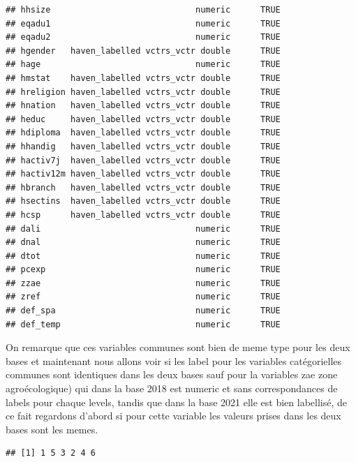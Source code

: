 \documentclass[
]{article}
\newenvironment{Shaded}{\begin{snugshade}}{\end{snugshade}}
\newcommand{\DocumentationTok}[1]{\textcolor[rgb]{0.56,0.35,0.01}{\textbf{\textit{#1}}}}
\newcommand{\FunctionTok}[1]{\textcolor[rgb]{0.13,0.29,0.53}{\textbf{#1}}}
\newcommand{\NormalTok}[1]{#1}
\newcommand{\SpecialCharTok}[1]{\textcolor[rgb]{0.81,0.36,0.00}{\textbf{#1}}}
\begin{document}
\begin{verbatim}
## hhsize                             numeric      TRUE
## eqadu1                             numeric      TRUE
## eqadu2                             numeric      TRUE
## hgender   haven_labelled vctrs_vctr double      TRUE
## hage                               numeric      TRUE
## hmstat    haven_labelled vctrs_vctr double      TRUE
## hreligion haven_labelled vctrs_vctr double      TRUE
## hnation   haven_labelled vctrs_vctr double      TRUE
## heduc     haven_labelled vctrs_vctr double      TRUE
## hdiploma  haven_labelled vctrs_vctr double      TRUE
## hhandig   haven_labelled vctrs_vctr double      TRUE
## hactiv7j  haven_labelled vctrs_vctr double      TRUE
## hactiv12m haven_labelled vctrs_vctr double      TRUE
## hbranch   haven_labelled vctrs_vctr double      TRUE
## hsectins  haven_labelled vctrs_vctr double      TRUE
## hcsp      haven_labelled vctrs_vctr double      TRUE
## dali                               numeric      TRUE
## dnal                               numeric      TRUE
## dtot                               numeric      TRUE
## pcexp                              numeric      TRUE
## zzae                               numeric      TRUE
## zref                               numeric      TRUE
## def_spa                            numeric      TRUE
## def_temp                           numeric      TRUE
\end{verbatim}

On remarque que ces variables communes sont bien de meme type pour les
deux bases et maintenant nous allons voir si les label pour les
variables catégorielles communes sont identiques dans les deux bases
sauf pour la variables zae zone agroécologique) qui dans la base 2018
est numeric et sans correspondances de labels pour chaque levels, tandis
que dans la base 2021 elle est bien labellisé, de ce fait regardons
d'abord si pour cette variable les valeurs prises dans les deux bases
sont les memes.

\begin{Shaded}
\end{Shaded}

\begin{verbatim}
## [1] 1 5 3 2 4 6
\end{verbatim}

\begin{Shaded}
\end{Shaded}
\end{document}
